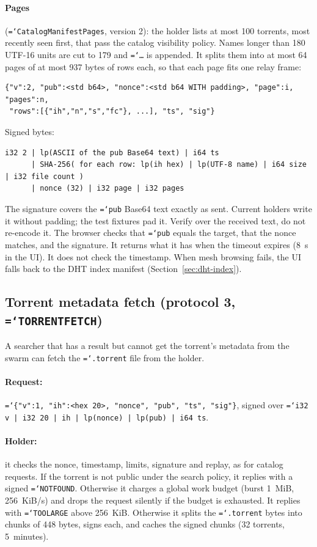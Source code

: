 \documentclass[11pt,a4paper]{article}
\newcommand{\code}[1]{\texttt{\hyphenchar\font=`\-\relax #1}}
\DeclareRobustCommand{\_}{\origunderscore\allowbreak}
\begin{document}
\paragraph{Pages} (\code{CatalogManifestPages}, version 2): the holder lists at most 100
torrents, most recently seen first, that pass the catalog visibility policy. Names longer than
180 UTF-16 units are cut to 179 and \code{…} is appended. It splits them into at most 64
pages of at most 937 bytes of rows each, so that each page fits one relay frame:
\begin{lstlisting}
{"v":2, "pub":<std b64>, "nonce":<std b64 WITH padding>, "page":i, "pages":n,
 "rows":[{"ih","n","s","fc"}, ...], "ts", "sig"}
\end{lstlisting}
Signed bytes:
\begin{lstlisting}
i32 2 | lp(ASCII of the pub Base64 text) | i64 ts
      | SHA-256( for each row: lp(ih hex) | lp(UTF-8 name) | i64 size | i32 file count )
      | nonce (32) | i32 page | i32 pages
\end{lstlisting}
The signature covers the \code{pub} Base64 text exactly as sent. Current holders write it
without padding; the test fixtures pad it. Verify over the received text, do not re-encode it.
The browser checks that \code{pub} equals the target, that the nonce matches, and the
signature. It returns what it has when the timeout expires (8~s in the UI). It does not check
the timestamp. When mesh browsing fails, the UI falls back to the DHT index manifest
(Section~\ref{sec:dht-index}).

\subsection{\texorpdfstring{Torrent metadata fetch (protocol 3, \code{TORRENT\_FETCH})}{Torrent metadata fetch (protocol 3, TORRENT\textunderscore FETCH)}}
\label{sec:fetch}
A searcher that has a result but cannot get the torrent's metadata from the swarm can fetch the
\code{.torrent} file from the holder.
\paragraph{Request:} \code{\{"v":1, "ih":<hex 20>, "nonce", "pub", "ts", "sig"\}}, signed over
\code{i32 v | i32 20 | ih | lp(nonce) | lp(pub) | i64 ts}.
\paragraph{Holder:} it checks the nonce, timestamp, limits, signature and replay, as for
catalog requests. If the torrent is not public under the search policy, it replies with a
signed \code{NOT\_FOUND}. Otherwise it charges a global work budget (burst 1~MiB,
256~KiB/s) and drops the request silently if the budget is exhausted. It replies with
\code{TOO\_LARGE} above 256~KiB. Otherwise it splits the \code{.torrent} bytes into chunks
of 448 bytes, signs each, and caches the signed chunks (32 torrents, 5~minutes).
\end{document}
